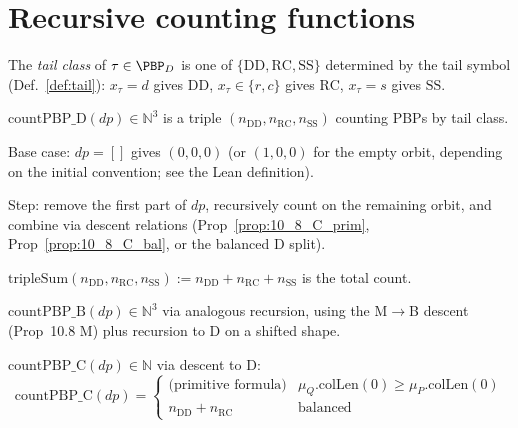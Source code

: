 \section{Recursive counting functions}

\begin{definition}
  \label{def:tailClass_D}
  \leanok
  The \emph{tail class} of $\tau \in \PBP_D$ is one of $\{\mathrm{DD}, \mathrm{RC}, \mathrm{SS}\}$
  determined by the tail symbol (Def.~\ref{def:tail}): $x_\tau = d$ gives $\mathrm{DD}$,
  $x_\tau \in \{r, c\}$ gives $\mathrm{RC}$, $x_\tau = s$ gives $\mathrm{SS}$.
\end{definition}

\begin{definition}
  \label{def:countPBP_D}
  \leanok
  $\mathrm{countPBP\_D}(dp) \in \mathbb{N}^3$ is a triple
  $(n_{\mathrm{DD}}, n_{\mathrm{RC}}, n_{\mathrm{SS}})$ counting PBPs by tail class.

  Base case: $dp = []$ gives $(0, 0, 0)$ (or $(1, 0, 0)$ for the empty orbit, depending on
  the initial convention; see the Lean definition).

  Step: remove the first part of $dp$, recursively count on the remaining orbit, and
  combine via descent relations (Prop~\ref{prop:10_8_C_prim}, Prop~\ref{prop:10_8_C_bal},
  or the balanced D split).

  $\mathrm{tripleSum}(n_{\mathrm{DD}}, n_{\mathrm{RC}}, n_{\mathrm{SS}}) := n_{\mathrm{DD}} + n_{\mathrm{RC}} + n_{\mathrm{SS}}$ is the total count.
\end{definition}

\begin{definition}
  \label{def:countPBP_B}
  \leanok
  $\mathrm{countPBP\_B}(dp) \in \mathbb{N}^3$ via analogous recursion, using
  the M$\to$B descent (Prop~10.8 M) plus recursion to D on a shifted shape.
\end{definition}

\begin{definition}
  \label{def:countPBP_C}
  \leanok
  $\mathrm{countPBP\_C}(dp) \in \mathbb{N}$ via descent to D:
  \[
    \mathrm{countPBP\_C}(dp) =
    \begin{cases}
      \text{(primitive formula)} & \mu_Q.\mathrm{colLen}(0) \geq \mu_P.\mathrm{colLen}(0) \\
      n_{\mathrm{DD}} + n_{\mathrm{RC}} & \text{balanced}
    \end{cases}
  \]
\end{definition}

